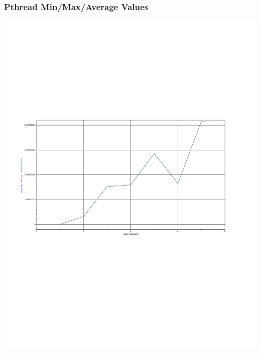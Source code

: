 \documentclass{article}
\begin{document}
\subsubsection*{Pthread Min/Max/Average Values}
\includegraphics[scale=0.5]{images/pthread_vals.pdf}
\end{document}
